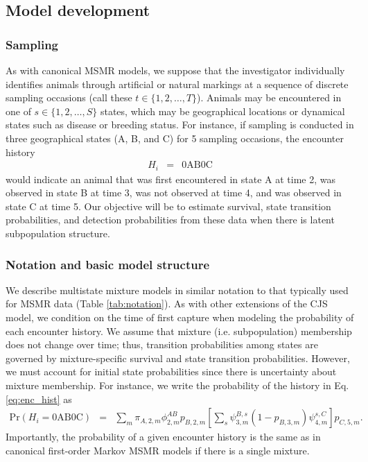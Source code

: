 \documentclass[times,mee,doublespace,]{besauth2}
\begin{document}
\subsection{Model development}

\subsubsection{Sampling}

As with canonical MSMR models, we suppose that the investigator individually identifies animals through artificial or natural markings at a sequence of discrete sampling occasions (call these  $t \in \{ 1, 2, \hdots, T \}$). Animals may be encountered in one of $s \in \{ 1, 2, \hdots, S \}$ states, which may be geographical locations or dynamical states such as disease or breeding status. For instance, if sampling is conducted in three geographical states (A, B, and C) for 5 sampling occasions, the encounter history
\begin{eqnarray*}
  \label{eq:enc_hist}
  H_i & = & \textrm{0AB0C}
\end{eqnarray*}
would indicate an animal that was first encountered in state A at time 2, was observed in state B at time 3, was not observed at time 4, and was observed in state C at time 5.  Our objective will be to estimate survival, state transition probabilities, and detection probabilities from these data when there is latent subpopulation structure.

\subsubsection{Notation and basic model structure}

We describe multistate mixture models in similar notation to that typically used for MSMR data (Table \ref{tab:notation}).  As with other extensions of the CJS model, we condition on the time of first capture when modeling the probability of each encounter history.
We assume that mixture (i.e. subpopulation) membership does not change over time; thus, transition probabilities among states are governed by mixture-specific survival and state transition probabilities.  However, we must account for initial state probabilities since there is uncertainty about mixture membership.  For instance, we write the probability of the history in Eq. \ref{eq:enc_hist} as
\begin{eqnarray*}
  \textrm{Pr}(H_i = \textrm{0AB0C}) & = & \sum_m \pi_{A,2,m} \phi_{2,m}^{AB} p_{B,2,m} \left[ \sum_s \psi_{3,m}^{B,s} (1-p_{B,3,m}) \psi_{4,m}^{s,C} \right] p_{C,5,m}.
\end{eqnarray*}
Importantly, the probability of a given encounter history is the same as in canonical first-order Markov MSMR models \citep[e.g. as in][]{Brownie1993} if there is a single mixture.
\end{document}

